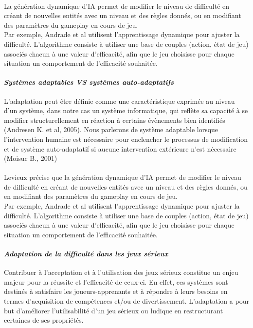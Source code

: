 		\paragraph{}
La génération dynamique d’IA permet de modifier le niveau de difficulté en créant de nouvelles entités avec un niveau et des règles donnés, ou en modifiant des paramètres du gameplay en cours de jeu.\\
Par exemple, Andrade et al utilisent l’apprentissage dynamique pour ajuster la difficulté. L’algorithme consiste à utiliser une base de couples (action, état de jeu) associés chacun à une valeur d’efficacité, afin que le jeu choisisse pour chaque situation un comportement de l’efficacité souhaitée.			
				
		\paragraph{\emph{Systèmes adaptables VS systèmes auto-adaptatifs} \\ \quad} 
L’adaptation peut être définie comme une caractéristique exprimée au niveau d’un système, dans notre cas un système informatique, qui reflète sa capacité à se modifier structurellement en réaction à certains évènements bien identifiés (Andresen K. et al, 2005). Nous parlerons de système adaptable lorsque l’intervention humaine est nécessaire pour enclencher le processus de modification et de système auto-adaptatif si aucune intervention extérieure n'est nécessaire (Moisuc B., 2001)

\paragraph{}
Levieux précise que la génération dynamique d’IA permet de modifier le niveau de difficulté en créant de nouvelles entités avec un niveau et des règles donnés, ou en modifiant des paramètres du gameplay en cours de jeu.\\
Par exemple, Andrade et al utilisent l’apprentissage dynamique pour ajuster la difficulté. L’algorithme consiste à utiliser une base de couples (action, état de jeu) associés chacun à une valeur d’efficacité, afin que le jeu choisisse pour chaque situation un comportement de l’efficacité souhaitée.

		\paragraph{\emph{Adaptation de la difficulté dans les jeux sérieux} \\ \quad}
Contribuer à l'acceptation et à l'utilisation des jeux sérieux constitue un enjeu majeur pour la réussite et l'efficacité de ceux-ci. En effet, ces systèmes sont destinés à satisfaire les joueurs-apprenants et à répondre à leurs besoins en termes d'acquisition de compétences et/ou de divertissement. L’adaptation a pour but d’améliorer l’utilisabilité d’un jeu sérieux ou ludique en restructurant certaines de ses propriétés.


